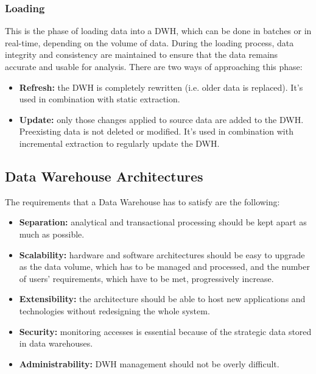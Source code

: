 \subsubsection{Loading}
This is the phase of loading data into a DWH, which can be done in batches or in real-time, depending on the volume of data. During the loading process, data integrity and consistency are maintained to ensure that the data remains accurate and usable for analysis. There are two ways of approaching this phase:
\begin{itemize}
    \item \textbf{Refresh:} the DWH is completely rewritten (i.e. older data is replaced). It's used in combination with static extraction.
    \item \textbf{Update:} only those changes applied to source data are added to the DWH. Preexisting data is not deleted or modified. It's used in combination with incremental extraction to regularly update the DWH.
\end{itemize}

\subsection{Data Warehouse Architectures}

The requirements that a Data Warehouse has to satisfy are the following:
\begin{itemize}
    \item \textbf{Separation:} analytical and transactional processing should be kept apart as much as possible.
    \item \textbf{Scalability:} hardware and software architectures should be easy to upgrade as the data volume, which has to be managed and processed, and the number of users' requirements, which have to be met, progressively increase.
    \item \textbf{Extensibility:} the architecture should be able to host new applications and technologies without redesigning the whole system.
    \item \textbf{Security:} monitoring accesses is essential because of the strategic data stored in data warehouses.
    \item \textbf{Administrability:} DWH management should not be overly difficult.
\end{itemize}

